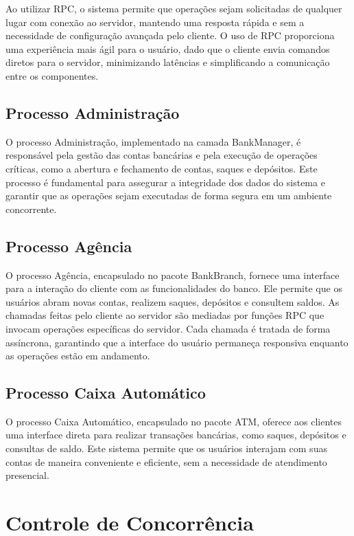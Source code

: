 \documentclass[a4paper,10pt]{article}
\begin{document}
\begin{multicols}{2}
Ao utilizar RPC, o sistema permite que operações sejam solicitadas de qualquer lugar com conexão ao servidor, mantendo uma resposta rápida e sem a necessidade de configuração avançada pelo cliente. O uso de RPC proporciona uma experiência mais ágil para o usuário, dado que o cliente envia comandos diretos para o servidor, minimizando latências e simplificando a comunicação entre os componentes.

\subsection{Processo Administração}

O processo Administração, implementado na camada BankManager, é responsável pela gestão das contas bancárias e pela execução de operações críticas, como a abertura e fechamento de contas, saques e depósitos. Este processo é fundamental para assegurar a integridade dos dados do sistema e garantir que as operações sejam executadas de forma segura em um ambiente concorrente.

\subsection{Processo Agência}

O processo Agência, encapsulado no pacote BankBranch, fornece uma interface para a interação do cliente com as funcionalidades do banco. Ele permite que os usuários abram novas contas, realizem saques, depósitos e consultem saldos. As chamadas feitas pelo cliente ao servidor são mediadas por funções RPC que invocam operações específicas do servidor. Cada chamada é tratada de forma assíncrona, garantindo que a interface do usuário permaneça responsiva enquanto as operações estão em andamento.

\subsection{Processo Caixa Automático}

O processo Caixa Automático, encapsulado no pacote ATM, oferece aos clientes uma interface direta para realizar transações bancárias, como saques, depósitos e consultas de saldo. Este sistema permite que os usuários interajam com suas contas de maneira conveniente e eficiente, sem a necessidade de atendimento presencial.

\section{Controle de Concorrência}


\end{multicols}
\end{document}
